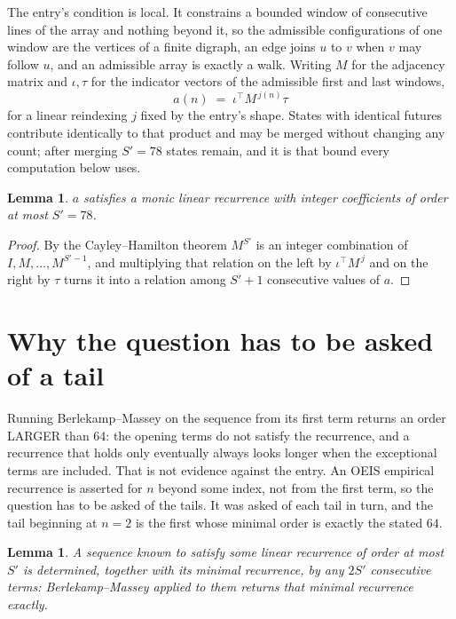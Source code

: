 \documentclass[11pt,a4paper]{article}
\theoremstyle{plain}
\newtheorem{lemma}[theorem]{Lemma}
\theoremstyle{definition}
\begin{document}
The entry's condition is local. It constrains a bounded window of consecutive lines of the
array and nothing beyond it, so the admissible configurations of one window are the vertices of
a finite digraph, an edge joins $u$ to $v$ when $v$ may follow $u$, and an admissible array is
exactly a walk. Writing $M$ for the adjacency matrix and $\iota,\tau$ for the indicator vectors
of the admissible first and last windows,
\[
a(n)\;=\;\iota^{\!\top}M^{\,j(n)}\tau
\]
for a linear reindexing $j$ fixed by the entry's shape. States with identical futures
contribute identically to that product and may be merged without changing any count; after
merging $S'=78$ states remain, and it is that bound every computation below uses.

\begin{lemma}\label{lem:cf}
$a$ satisfies a monic linear recurrence with integer coefficients of order at most $S'=78$.
\end{lemma}

\begin{proof}
By the Cayley--Hamilton theorem $M^{S'}$ is an integer combination of $I,M,\dots,M^{S'-1}$,
and multiplying that relation on the left by $\iota^{\!\top}M^{\,j}$ and on the right by
$\tau$ turns it into a relation among $S'+1$ consecutive values of $a$.
\end{proof}

\section{Why the question has to be asked of a tail}

Running Berlekamp--Massey on the sequence from its first term returns an order LARGER than $64$: the opening terms do not satisfy the recurrence, and a recurrence that holds only eventually always looks longer when the exceptional terms are included. That is not evidence against the entry. An OEIS empirical recurrence is asserted for $n$ beyond some index, not from the first term, so the question has to be asked of the tails. It was asked of each tail in turn, and the tail beginning at $n=2$ is the first whose minimal order is exactly the stated $64$.

\begin{lemma}\label{lem:bm}
A sequence known to satisfy some linear recurrence of order at most $S'$ is determined,
together with its minimal recurrence, by any $2S'$ consecutive terms: Berlekamp--Massey applied
to them returns that minimal recurrence exactly.
\end{lemma}
\end{document}
